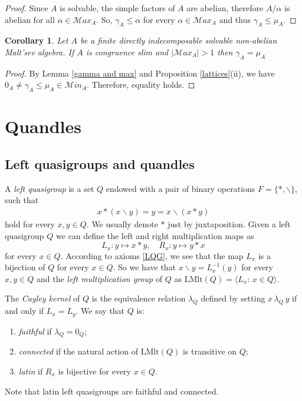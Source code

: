 \documentclass[a4paper, english, 9pt]{amsart}
\theoremstyle{plain}
\newtheorem{corollary}[theorem]{Corollary}
\theoremstyle{definition}
\def\lmlt{\mathrm{LMlt}}
\def\Ma{\mathcal Max}
\def\ma{\mathcal Min}
\begin{document}
\begin{proof}
Since $A$ is solvable, the simple factors of $A$ are abelian, therefore $A/\alpha$ is abelian for all $\alpha\in\Ma_A$. So,  $\gamma_A\leq\alpha$ for every $\alpha\in \Ma_A$ and thus $\gamma_A\leq \mu_A$. %
\end{proof}

\begin{corollary}\label{mu and gamma}
Let $A$ be a finite directly indecomposable solvable non-abelian Malt'sev algebra. If $A$ is congruence slim and $|\Ma_A|> 1$ then 
$\gamma_A	=\mu_A$ 
\end{corollary}

\begin{proof}
By Lemma \ref{gamma and max} and Proposition \ref{lattices}(ii), we have $0_A\neq \gamma_A\leq \mu_A\in \ma_A$. Therefore, equality holds.
\end{proof}


\section{Quandles} \label{sec:quandles}

\subsection{Left quasigroups and quandles}
A {\it left quasigroup} is a set $Q$ endowed with a pair of binary operations $F=\{*,\backslash\}$, such that 
\begin{align}\label{LQG}
x*(x\backslash y)=y=x\backslash(x*y)
\end{align}
hold for every $x,y\in Q$. We usually denote $*$ just by juxtaposition. Given a left quasigroup $Q$ we can define the left and right multiplication maps as
$$L_x:y\mapsto x*y,\quad R_x:y\mapsto y*x$$
for every $x\in Q$. According to axioms \eqref{LQG}, we see that the map $L_x$ is a bijection of $Q$ for every $x\in Q$. So we have that $x\backslash y=L_x^{-1}(y)$ for every $x,y\in Q$ and the {\it left multiplication group} of $Q$ as $\lmlt(Q)=\langle L_x\colon\, x\in Q\rangle$.


The {\it Cayley kernel} of $Q$ is the equivalence relation $\lambda_Q$ defined by setting $x\, \lambda_Q\, y$ if and only if $L_x=L_y$. We say that $Q$ is:
\begin{enumerate}[label=(\roman*)]
    \item {\it faithful} if $\lambda_Q=0_Q$;
    \item {\it connected} if the natural action of $\lmlt(Q)$ is transitive on $Q$;
    \item {\it latin} if $R_x$ is bijective for every $x\in Q$.
\end{enumerate}
Note that latin left quasigroups are faithful and connected.
\end{document}
